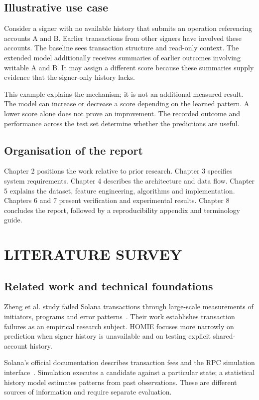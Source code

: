 \documentclass[12pt,a4paper,oneside]{report}
\begin{document}
\section{Illustrative use case}
Consider a signer with no available history that submits an operation referencing accounts A and B. Earlier transactions from other signers have involved these accounts. The baseline sees transaction structure and read-only context. The extended model additionally receives summaries of earlier outcomes involving writable A and B. It may assign a different score because these summaries supply evidence that the signer-only history lacks.

This example explains the mechanism; it is not an additional measured result. The model can increase or decrease a score depending on the learned pattern. A lower score alone does not prove an improvement. The recorded outcome and performance across the test set determine whether the predictions are useful.
\section{Organisation of the report}
Chapter 2 positions the work relative to prior research. Chapter 3 specifies system requirements. Chapter 4 describes the architecture and data flow. Chapter 5 explains the dataset, feature engineering, algorithms and implementation. Chapters 6 and 7 present verification and experimental results. Chapter 8 concludes the report, followed by a reproducibility appendix and terminology guide.

\chapter{LITERATURE SURVEY}
\section{Related work and technical foundations}
Zheng et al. study failed Solana transactions through large-scale measurements of initiators, programs and error patterns~\cite{zheng}. Their work establishes transaction failures as an empirical research subject. HOMIE focuses more narrowly on prediction when signer history is unavailable and on testing explicit shared-account history.

Solana's official documentation describes transaction fees and the RPC simulation interface~\cite{fees,simulation,send}. Simulation executes a candidate against a particular state; a statistical history model estimates patterns from past observations. These are different sources of information and require separate evaluation.
\end{document}
